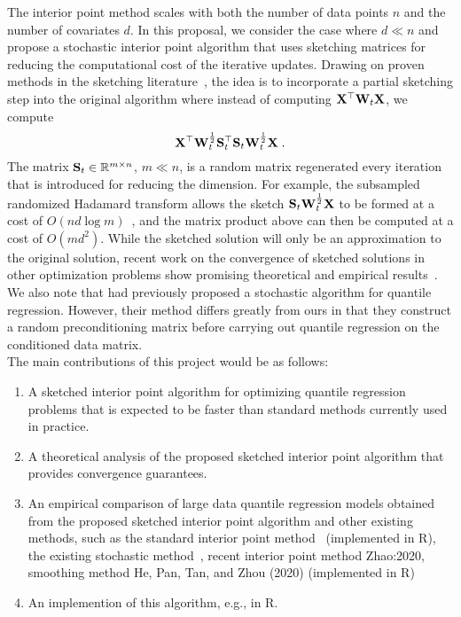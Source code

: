 The interior point method scales with both the number of data points $n$ and the number of covariates $d$. In this proposal, we consider the case where $d\ll n$ and propose a stochastic interior point algorithm that uses sketching matrices for reducing the computational cost of the iterative updates. Drawing on proven methods in the sketching literature~\cite{Pilanci:2017}, the idea is to incorporate a partial sketching step into the original algorithm where instead of computing $\mathbf{X}^\top\mathbf{W}_t\mathbf{X}$, we compute
\[
\mathbf{X}^\top\mathbf{W}_t^\frac{1}{2}\mathbf{S}_t^\top\mathbf{S}_t\mathbf{W}_t^\frac{1}{2}\mathbf{X} \;.
\]
The matrix $\mathbf{S}_t\in\mathbb{R}^{m\times n}$, $m\ll n$, is a random matrix regenerated every iteration that is introduced for reducing the dimension. For example, the subsampled randomized Hadamard transform allows the sketch $\mathbf{S}_t\mathbf{W}_t^\frac{1}{2}\mathbf{X}$ to be formed at a cost of $O(nd\log m)$~\citep{Lacotte:2020}, and the matrix product above can then be computed at a cost of $O(md^2)$. While the sketched solution will only be an approximation to the original solution, recent work on the convergence of sketched solutions in other optimization problems show promising theoretical and empirical results~\citep[e.g.,][]{Pilanci:2017,Derezinski:2021,Lacotte:2021}. We also note that \citet{Yang:2013} had previously proposed a stochastic algorithm for quantile regression. However, their method differs greatly from ours in that they construct a random preconditioning matrix before carrying out quantile regression on the conditioned data matrix.
\\

The main contributions of this project would be as follows:
\begin{enumerate}
\item
A sketched interior point algorithm for optimizing quantile regression problems that is expected to be faster than standard methods currently used in practice.
\item
A theoretical analysis of the proposed sketched interior point algorithm that provides convergence guarantees.
\item
An empirical comparison of large data quantile regression models obtained from the proposed sketched interior point algorithm and other existing methods, such as the standard interior point method~\citep{Portnoy:1997} (implemented in R), the existing stochastic method~\citep{Yang:2013}, \todo recent interior point method Zhao:2020, smoothing method He, Pan, Tan, and Zhou (2020) (implemented in R)
\item
An implemention of this algorithm, e.g., in R.
\end{enumerate}

